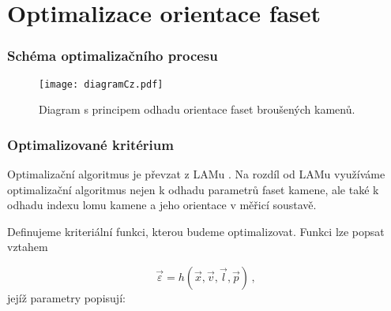 \part{Optimalizace orientace faset}
	
\section{Schéma optimalizačního procesu}

%
%

\begin{figure} [h!]
\centering
\texttt{[image: diagramCz.pdf]}
\caption{Diagram s principem odhadu orientace faset broušených kamenů.}
\label{fig:diagram}
\end{figure}

\clearpage


\section{Optimalizované kritérium}
\label{sec:Optimalizace_crit}
Optimalizační algoritmus je převzat z LAMu \cite{Bodlak2005}. Na rozdíl od LAMu využíváme optimalizační algoritmus nejen k odhadu parametrů faset kamene, ale také k odhadu indexu lomu kamene a jeho orientace v měřicí soustavě.

Definujeme kriteriální funkci, kterou budeme optimalizovat. Funkci lze popsat vztahem 

\begin{equation}
\vec{\varepsilon} = h\left(\vec{x},\vec{v},\vec{l},\vec{p} \right)\,,
\label{eq: opt_criter}
\end{equation}
jejíž parametry popisují: 

